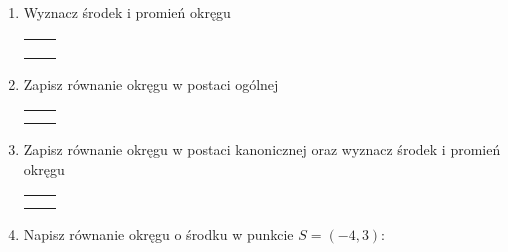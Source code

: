 \documentclass[12pt,a4paper]{article}
\begin{document}
\begin{enumerate}[1.]
 	\item Wyznacz środek i promień okręgu
 	
 	\begin{enumerate}[a)] \begin{tabular}{p{7cm} p{7cm}}
	\item $(x-3)^2 + (y+2)^2=25$& \item $(x+3)^2 + (y+5)^2=9$ \\
	\item $(x-1)^2 + (y+4)^2=8$& \item $(x-7)^2 + (y-4)^2=96$ \\
	\item $x^2 + y^2=1$& \item $(x-\sqrt{2})^2 + (y+4\sqrt{2})^2=\sqrt{2}$ \\
	\end{tabular} \end{enumerate}
 	
 	\item Zapisz równanie okręgu w postaci ogólnej
 	
 	\begin{enumerate}[a)] \begin{tabular}{p{7cm} p{7cm}}
 	\item $(x+1)^2 + (y-1)^2=1$& \item $(x+2)^2 + (y-3)^2=4$ \\
 	\item $(x-4)^2 + (y+3)^2=10$& \item $(x-3)^2 + (y-3)^2=18$ \\
 	\end{tabular} \end{enumerate}
 	
 	\item Zapisz równanie okręgu w postaci kanonicznej oraz wyznacz środek i promień okręgu
 	
 	 	\begin{enumerate}[a)] \begin{tabular}{p{7cm} p{7cm}}
 			\item $x^2+y^2+6x-4y-12=0$& \item $x^2+y^2-6y+5=0$ \\
 			\item $x^2+y^2-2x+4y-5=0$& \item $x^2+y^2+8x-12y+25=0$ \\
 	\end{tabular} \end{enumerate}
 	
 	\item Napisz równanie okręgu o środku w punkcie $S=(-4,3)$:
 	

\end{enumerate}
\end{document}
